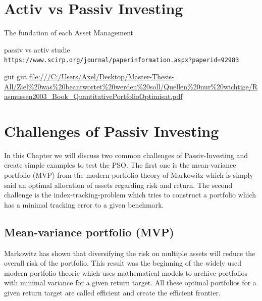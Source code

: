 \documentclass[
  oneside]{book}
\newenvironment{Shaded}{\begin{snugshade}}{\end{snugshade}}
\newcommand{\AttributeTok}[1]{\textcolor[rgb]{0.77,0.63,0.00}{#1}}
\newcommand{\FunctionTok}[1]{\textcolor[rgb]{0.00,0.00,0.00}{#1}}
\newcommand{\NormalTok}[1]{#1}
\newcommand{\SpecialCharTok}[1]{\textcolor[rgb]{0.00,0.00,0.00}{#1}}
\newcommand{\StringTok}[1]{\textcolor[rgb]{0.31,0.60,0.02}{#1}}
\begin{document}
\hypertarget{activ-vs-passiv-investing}{%
\chapter{Activ vs Passiv Investing}\label{activ-vs-passiv-investing}}

The fundation of each Asset Management

passiv vs activ studie
\texttt{https://www.scirp.org/journal/paperinformation.aspx?paperid=92983}

gut gut
\url{file:///C:/Users/Axel/Desktop/Master-Thesis-All/Ziel\%20was\%20beantwortet\%20werden\%20soll/Quellen\%20nur\%20wichtige/Rasmussen2003_Book_QuantitativePortfolioOptimisat.pdf}

\begin{Shaded}
\end{Shaded}

\hypertarget{challenges-of-passiv-investing}{%
\chapter{Challenges of Passiv Investing}\label{challenges-of-passiv-investing}}

In this Chapter we will discuss two common challenges of Passiv-Investing and create simple examples to test the PSO. The first one is the mean-variance portfolio (MVP) from the modern portfolio theory of Markowitz which is simply said an optimal allocation of assets regarding risk and return. The second challenge is the index-tracking-problem which tries to construct a portfolio which has a minimal tracking error to a given benchmark.

\hypertarget{mean-variance-portfolio-mvp}{%
\section{Mean-variance portfolio (MVP)}\label{mean-variance-portfolio-mvp}}

Markowitz has shown that diversifying the risk on multiple assets will reduce the overall risk of the portfolio. This result was the beginning of the widely used modern portfolio theorie which uses mathematical models to archive portfolios with minimal variance for a given return target. All these optimal portfolios for a given return target are called efficient and create the efficient frontier.
\end{document}
